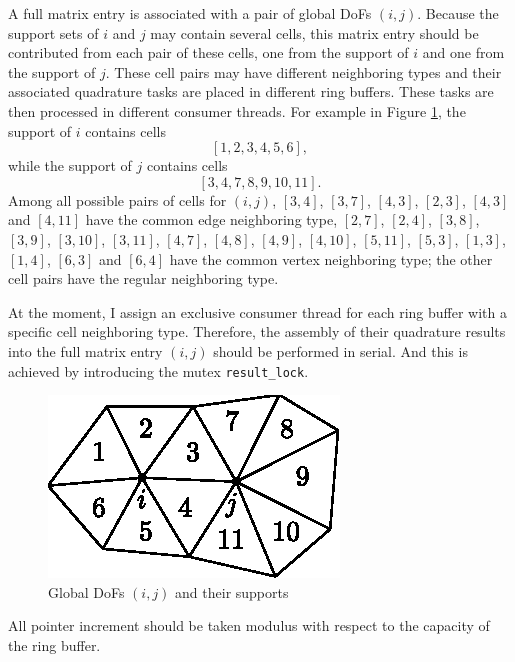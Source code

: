 \documentclass[11pt, a4paper]{book}
\begin{document}
\begin{itemize}
\begin{itemize}
    A full matrix entry is associated with a pair of global DoFs $(i, j)$. Because the
    support sets of $i$ and $j$ may contain several cells, this matrix entry should be
    contributed from each pair of these cells, one from the support of $i$ and one from
    the support of $j$. These cell pairs may have different neighboring types and their
    associated quadrature tasks are placed in different ring buffers. These tasks are then
    processed in different consumer threads. For example in Figure
    \ref{fig:dofs-and-supports}, the support of $i$ contains cells
    $$
    [1,2,3,4,5,6],
    $$
    while the support of $j$ contains cells
    $$
    [3,4,7,8,9,10,11].
    $$
    Among all possible pairs of cells for $(i, j)$, $[3, 4]$, $[3, 7]$, $[4,3]$, $[2, 3]$,
    $[4, 3]$ and $[4, 11]$ have the common edge neighboring type, $[2, 7]$, $[2, 4]$,
    $[3, 8]$, $[3, 9]$, $[3, 10]$, $[3, 11]$, $[4, 7]$, $[4, 8]$, $[4, 9]$, $[4, 10]$,
    $[5, 11]$, $[5, 3]$, $[1, 3]$, $[1, 4]$, $[6, 3]$ and $[6, 4]$ have the common vertex
    neighboring type; the other cell pairs have the regular neighboring type.
    
    At the moment, I assign an exclusive consumer thread for each ring buffer with a
    specific cell neighboring type. Therefore, the assembly of their quadrature results
    into the full matrix entry $(i, j)$ should be performed in serial. And this is
    achieved by introducing the mutex \texttt{result\_lock}.

    \begin{figure}[htbp]
      \centering
      \includegraphics{figures/2023-06-21-dofs-and-supports}
      \caption{Global DoFs $(i, j)$ and their supports}
      \label{fig:dofs-and-supports}
    \end{figure}
  \end{itemize}
\end{itemize}

\begin{mycomment}
  All pointer increment should be taken modulus with respect to the capacity of the ring buffer.
\end{mycomment}
\end{document}
